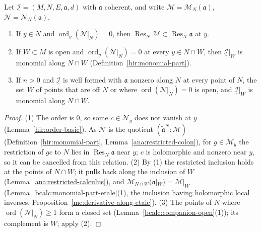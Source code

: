 \begin{lemma}
\label{bcalc:nonmonomial-order-zero}
\mixedleanok
Let \(\underline{\mathcal I}=(M,N,E,\mathfrak a,d)\) with \(\mathfrak a\) coherent, and write \(\mathcal M=\mathcal M_N(\mathfrak a)\), \(\mathcal N=\mathcal N_N(\mathfrak a)\).
\begin{enumerate}
\item If \(y\in N\) and \(\operatorname{ord}_y(\mathcal N|_N)=0\), then \(\operatorname{Res}_N\mathcal M\subset\operatorname{Res}_N\mathfrak a\) at \(y\).
\item If \(W\subset M\) is open and \(\operatorname{ord}_y(\mathcal N|_N)=0\) at every \(y\in N\cap W\), then \(\underline{\mathcal I}|_W\) is monomial along \(N\cap W\)
(Definition~\ref{hir:monomial-part}).
\item If \(n>0\) and \(\underline{\mathcal I}\) is well formed with \(\mathfrak a\) nonzero along \(N\) at every point of \(N\), the set \(W\) of points that are off \(N\) or where
\(\operatorname{ord}(\mathcal N|_N)=0\) is open, and \(\underline{\mathcal I}|_W\) is monomial along \(N\cap W\).
\end{enumerate}
\end{lemma}
\begin{proof}
\mixedleanok
(1) The order is \(0\), so some \(c\in\mathcal N_y\) does not vanish at \(y\) (Lemma~\ref{hir:order-basic}). As \(\mathcal N\) is the quotient
\((\widetilde{\mathfrak a}^N:\mathcal M)\) (Definition~\ref{hir:monomial-part}, Lemma~\ref{ana:restricted-colon}), for \(g\in\mathcal M_y\) the restriction of \(gc\) to \(N\) lies
in \(\operatorname{Res}_N\mathfrak a\) near \(y\); \(c\) is holomorphic and nonzero near \(y\), so it can be cancelled from this relation. (2) By (1) the restricted inclusion holds
at the points of \(N\cap W\); it pulls back along the inclusion of \(W\) (Lemma~\ref{ana:restricted-calculus}), and \(\mathcal M_{N\cap W}(\mathfrak a|_W)=\mathcal M|_W\)
(Lemma~\ref{bcalc:monomial-part-etale}(1), the inclusion having holomorphic local inverses, Proposition~\ref{mc:derivative-along-etale}). (3) The points of \(N\) where
\(\operatorname{ord}(\mathcal N|_N)\ge1\) form a closed set (Lemma~\ref{bcalc:companion-open}(1)); its complement is \(W\); apply (2).
\end{proof}

